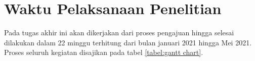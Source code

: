 \section{Waktu Pelaksanaan Penelitian}
Pada tugas akhir ini akan dikerjakan dari proses pengajuan hingga selesai dilakukan dalam 22 minggu terhitung dari bulan januari 2021 hingga Mei 2021. Proses seluruh kegiatan disajikan pada tabel \ref{tabel:gantt chart}.
\begin{table}[h]
	\centering
	\caption{Waktu Pelaksanaan Tugas Akhir}
	\label{tabel:gantt chart}
\end{table}
